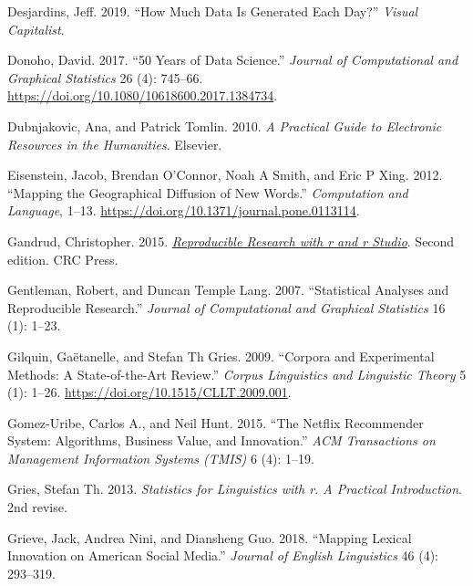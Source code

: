 \documentclass[
  letterpaper,
]{latex/krantz}
\newlength{\cslhangindent}
\newlength{\cslentryspacingunit} %
\newenvironment{CSLReferences}[2] %
 {%
  \setlength{\parindent}{0pt}
  \ifodd #1
  \let\oldpar\par
  \def\par{\hangindent=\cslhangindent\oldpar}
  \fi
  \setlength{\parskip}{#2\cslentryspacingunit}
 }%
 {}
\begin{document}
\begin{CSLReferences}{1}{0}
\leavevmode{}%
Desjardins, Jeff. 2019. {``How Much Data Is Generated Each Day?''}
\emph{Visual Capitalist}.

\leavevmode{}%
Donoho, David. 2017. {``50 Years of Data Science.''} \emph{Journal of
Computational and Graphical Statistics} 26 (4): 745--66.
\url{https://doi.org/10.1080/10618600.2017.1384734}.

\leavevmode{}%
Dubnjakovic, Ana, and Patrick Tomlin. 2010. \emph{A Practical Guide to
Electronic Resources in the Humanities}. Elsevier.

\leavevmode{}%
Eisenstein, Jacob, Brendan O'Connor, Noah A Smith, and Eric P Xing.
2012. {``Mapping the Geographical Diffusion of New Words.''}
\emph{Computation and Language}, 1--13.
\url{https://doi.org/10.1371/journal.pone.0113114}.

\leavevmode{}%
Gandrud, Christopher. 2015.
\emph{\href{https://www.ncbi.nlm.nih.gov/pubmed/17811671}{Reproducible
Research with r and r Studio}}. Second edition. CRC Press.

\leavevmode{}%
Gentleman, Robert, and Duncan Temple Lang. 2007. {``Statistical Analyses
and Reproducible Research.''} \emph{Journal of Computational and
Graphical Statistics} 16 (1): 1--23.

\leavevmode{}%
Gilquin, Gaëtanelle, and Stefan Th Gries. 2009. {``Corpora and
Experimental Methods: A State-of-the-Art Review.''} \emph{Corpus
Linguistics and Linguistic Theory} 5 (1): 1--26.
\url{https://doi.org/10.1515/CLLT.2009.001}.

\leavevmode{}%
Gomez-Uribe, Carlos A., and Neil Hunt. 2015. {``The Netflix Recommender
System: Algorithms, Business Value, and Innovation.''} \emph{ACM
Transactions on Management Information Systems (TMIS)} 6 (4): 1--19.

\leavevmode{}%
Gries, Stefan Th. 2013. \emph{Statistics for Linguistics with r. A
Practical Introduction}. 2nd revise.

\leavevmode{}%
Grieve, Jack, Andrea Nini, and Diansheng Guo. 2018. {``Mapping Lexical
Innovation on American Social Media.''} \emph{Journal of English
Linguistics} 46 (4): 293--319.


\end{CSLReferences}
\end{document}

